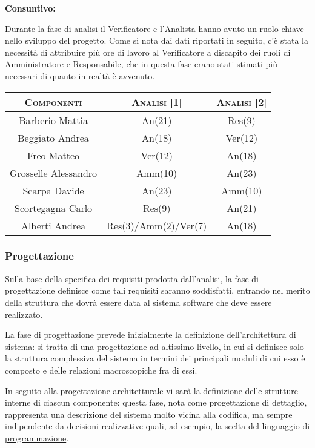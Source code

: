 \documentclass[11pt,a4paper]{article}
\begin{document}
\bigskip \bigskip 
\begin{large}\textbf{Consuntivo:}\end{large}
\newline
Durante la fase di analisi il Verificatore e l'Analista hanno avuto un ruolo chiave nello sviluppo del progetto.
Come si nota dai dati riportati in seguito, c'è stata la necessità di attribuire più ore di lavoro al Verificatore a discapito dei ruoli di Amministratore e Responsabile, che in questa fase erano stati stimati più necessari di quanto in realtà è avvenuto.
\\
\begin{center}
\begin{tabular}{|c||c|c|}
\hline
\textsc{Componenti} & \textsc{Analisi [1]} & \textsc{Analisi [2]} \\ \hline \hline
Barberio Mattia & An(21) & Res(9) \\ \hline
Beggiato Andrea & An(18) & Ver(12) \\ \hline
Freo Matteo & Ver(12) & An(18) \\ \hline
Grosselle Alessandro & Amm(10) & An(23) \\ \hline
Scarpa Davide & An(23) & Amm(10) \\ \hline
Scortegagna Carlo & Res(9) & An(21) \\ \hline
Alberti Andrea & Res(3)/Amm(2)/Ver(7) & An(18) \\ \hline
\end{tabular}
\end{center}
\bigskip
\subsubsection{Progettazione}
Sulla base della specifica dei requisiti prodotta dall'analisi, la fase di progettazione definisce come tali requisiti saranno soddisfatti, entrando nel merito della struttura che dovrà essere data al sistema software che deve essere realizzato.

La fase di progettazione prevede inizialmente la definizione dell'architettura di sistema: si tratta di una progettazione ad altissimo livello, in cui si definisce solo la struttura complessiva del sistema in termini dei principali moduli di cui esso è composto e delle relazioni macroscopiche fra di essi.

In seguito alla progettazione architetturale vi sarà la definizione delle strutture interne di ciascun componente: questa fase, nota come progettazione di dettaglio, rappresenta una descrizione del sistema molto vicina alla codifica, ma sempre indipendente da decisioni realizzative quali, ad esempio, la scelta del \underline{linguaggio di programmazione}.
\end{document}
